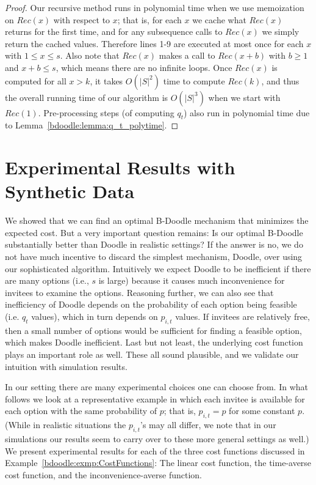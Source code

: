 \begin{proof}
	Our recursive method runs in polynomial time when we use memoization on $Rec(x)$ with respect to $x$; that is, for each $x$ we cache what $Rec(x)$ returns for the first time, and for any subsequence calls to $Rec(x)$ we simply return the cached values. Therefore lines 1-9 are executed at most once for each $x$ with $1 \leq x \leq s$. Also note that $Rec(x)$ makes a call to $Rec(x + b)$ with $b \geq 1$ and $x+b \leq s$, which means there are no infinite loops. Once $Rec(x)$ is computed for all $x > k$, it takes $O(|S|^2)$ time to compute $Rec(k)$, and thus the overall running time of our algorithm is $O(|S|^3)$ when we start with $Rec(1)$. Pre-processing steps (of computing $q_t$) also run in polynomial time due to Lemma~\ref{bdoodle:lemma:q_t_polytime}.
	\end{proof}





\section{Experimental Results with Synthetic Data}

We showed that we can find an optimal B-Doodle mechanism that minimizes the expected cost. But a very important question remains: Is our optimal B-Doodle substantially better than Doodle in realistic settings? If the answer is no, we do not have much incentive to discard the simplest mechanism, Doodle, over using our sophisticated algorithm. Intuitively we expect Doodle to be inefficient if there are many options (i.e., $s$ is large) because it causes much inconvenience for invitees to examine the options. Reasoning further, we can also see that inefficiency of Doodle depends on the probability of each option being feasible (i.e. $q_t$ values), which in turn depends on $p_{i, t}$ values. If invitees are relatively free, then a small number of options would be sufficient for finding a feasible option, which makes Doodle inefficient. Last but not least, the underlying cost function plays an important role as well. These all sound plausible, and we validate our intuition with simulation results.

In our setting there are many experimental choices one can choose from. In what follows we look at a representative example in which each invitee is available for each option with the same probability of $p$; that is, $p_{i, t} = p$ for some constant $p$. (While in realistic situations the $p_{i, t}$'s may all differ, we  note that in our simulations  our results seem to carry over to these more general settings as well.) We present experimental results for each of the three cost functions discussed in Example~\ref{bdoodle:exmp:CostFunctions}: The linear cost function, the time-averse cost function, and the inconvenience-averse function.

